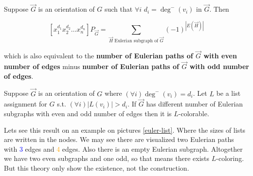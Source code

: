 \begin{lemma}
	Suppose $\overrightarrow{G}$ is an orientation of $G$ such that $\forall i$ $d_{i} = \deg^{-}(v_{i})$ in $\overrightarrow{G}$. Then
	
	$$
	[x_{1}^{d_{1}} x_{2}^{d_{2}} \dots x_{n}^{d_{n}}] P_{\overrightarrow{G}} = \sum_{\overrightarrow{H} \text{ Eulerian subgraph of } \overrightarrow{G}} (-1)^{\left| E \left( \overrightarrow{H} \right) \right|}
	$$
	
	which is also equivalent to the \textbf{number of Eulerian paths of $\overrightarrow{G}$ with even number of edges} minus \textbf{number of Eulerian paths of $\overrightarrow{G}$ with odd number of edges}.
\end{lemma}

\begin{cor}
	Suppose $\overrightarrow{G}$ is an orientation of $G$ where $(\forall i) \deg^{-}(v_{i}) = d_{i}$. Let $L$ be a list assignment for $G$ s.t. $(\forall i) |L(v_{i})| > d_{i}$. If $\overrightarrow{G}$ has different number of Eulerian subgraphs with even and odd number of edges then it is $L$-colorable.
\end{cor}

Lets see this result on an example on pictures \ref{euler-list}. Where the sizes of lists are written in the nodes. We may see there are visualized two Eulerian paths with \textcolor{blue}{3} edges and \textcolor{orange}{4} edges. Also there is an empty Eulerian subgraph. Altogether we have two even subgraphs and one odd, so that means there exists $L$-coloring. But this theory only show the existence, not the construction.


